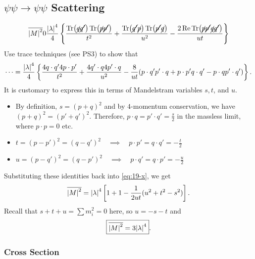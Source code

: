 
\subsection{\texorpdfstring{$\psi\psi \to\psi\psi$}{Psi-Psi} Scattering}%
\label{sub:psi_psi_scattering}

\begin{equation}
  \overline{\abs{M}^2} 0 \frac{\abs{\lambda}^4}{4} \left\{ \frac{\Tr(\cancel{q} \cancel{q'}) \Tr( \cancel{p} \cancel{p'})}{t^2} + \frac{\Tr(\cancel{q'}\cancel{p}) \Tr(\cancel{p'}\cancel{q})}{u^2} - \frac{2 \Re \Tr(\cancel{p} \cancel{p'} \cancel{q} \cancel{q'})}{ut} \right\}
\end{equation}
Use trace techniques (see PS3) to show that
\begin{equation}
  \label{eq:19-x}
  \dots = \frac{\abs{\lambda}^4}{4} \left\{ \frac{4 q \cdot q' 4 p \cdot p'}{t^2} + \frac{4 q' \cdot q 4 p' \cdot q}{u^2} - \frac{8}{ut} (p \cdot q' p' \cdot q + p \cdot p' q \cdot q' - p \cdot q p' \cdot q') \right\}.
\end{equation}
It is customary to express this in terms of Mandelstram variables $s, t$, and $u$.
 \begin{itemize}
   \item By definition, $s = (p+q)^2$ and by $4$-momentum conservation, we have  $(p + q)^2 = (p' + q')^2$. Therefore, $p \cdot q = p' \cdot q' = \frac{s}{2}$ in the massless limit, where $p \cdot p = 0$ etc.
   \item $t = (p - p')^2 = (q - q')^2 \quad \implies \quad p \cdot p' = q \cdot q' = -\frac{t}{2}$
   \item $u = (p - q')^2 = (q - p')^2 \quad \implies \quad p \cdot q' = q \cdot p' = -\frac{u}{2}$
\end{itemize}
Substituting these identities back into \eqref{eq:19-x}, we get
\begin{equation}
  \overline{\abs{M}^2} = \abs{\lambda}^4 \left[ 1 +1 - \frac{1}{2 ut} (u^2 + t^2 - s^2) \right].
\end{equation}
Recall that $s + t + u = \sum m_{i}^2 = 0$  here, so $u = -s - t$  and 
\begin{equation}
  \boxed{\overline{\abs{M}^2} = 3 \abs{\lambda}^4}.
\end{equation}

\subsubsection{Cross Section}%
\label{subsub:cross_section}

